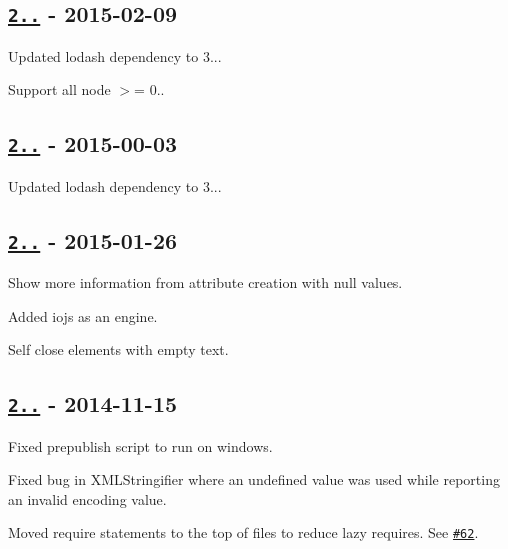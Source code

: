 \subsection*{\href{https://github.com/oozcitak/xmlbuilder-js/compare/v2.5.0...v2.5.1}{\tt 2..} -\/ 2015-\/02-\/09}


\begin{DoxyItemize}
\item Updated lodash dependency to 3...
\item Support all node $>$= 0..
\end{DoxyItemize}

\subsection*{\href{https://github.com/oozcitak/xmlbuilder-js/compare/v2.4.6...v2.5.0}{\tt 2..} -\/ 2015-\/00-\/03}


\begin{DoxyItemize}
\item Updated lodash dependency to 3...
\end{DoxyItemize}

\subsection*{\href{https://github.com/oozcitak/xmlbuilder-js/compare/v2.4.5...v2.4.6}{\tt 2..} -\/ 2015-\/01-\/26}


\begin{DoxyItemize}
\item Show more information from attribute creation with null values.
\item Added iojs as an engine.
\item Self close elements with empty text.
\end{DoxyItemize}

\subsection*{\href{https://github.com/oozcitak/xmlbuilder-js/compare/v2.4.4...v2.4.5}{\tt 2..} -\/ 2014-\/11-\/15}


\begin{DoxyItemize}
\item Fixed prepublish script to run on windows.
\item Fixed bug in X\+M\+L\+Stringifier where an undefined value was used while reporting an invalid encoding value.
\item Moved require statements to the top of files to reduce lazy requires. See \href{https://github.com/oozcitak/xmlbuilder-js/issues/62}{\tt \#62}.
\end{DoxyItemize}

